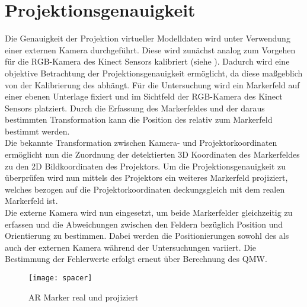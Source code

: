 \section{Projektionsgenauigkeit}
Die Genauigkeit der Projektion virtueller Modelldaten wird unter Verwendung einer externen Kamera durchgeführt. Diese wird zunächst analog zum Vorgehen für die RGB-Kamera des Kinect Sensors kalibriert (siehe ). Dadurch wird eine objektive Betrachtung der Projektionsgenauigkeit ermöglicht, da diese maßgeblich von der Kalibrierung des  abhängt. Für die Untersuchung wird ein Markerfeld auf einer ebenen Unterlage fixiert und im Sichtfeld der RGB-Kamera des Kinect Sensors platziert. Durch die Erfassung des Markerfeldes und der daraus bestimmten Transformation kann die Position des  relativ zum Markerfeld bestimmt werden.\\
Die bekannte Transformation zwischen Kamera- und Projektorkoordinaten ermöglicht nun die Zuordnung der detektierten 3D Koordinaten des Markerfeldes zu den 2D Bildkoordinaten des Projektors. Um die Projektionsgenauigkeit zu überprüfen wird nun mittels des Projektors ein weiteres Markerfeld projiziert, welches bezogen auf die Projektorkoordinaten deckungsgleich mit dem realen Markerfeld ist. \\
Die externe Kamera wird nun eingesetzt, um beide Markerfelder gleichzeitig zu erfassen und die Abweichungen zwischen den Feldern bezüglich Position und Orientierung zu bestimmen. Dabei werden die Positionierungen sowohl des  als auch der externen Kamera während der Untersuchungen variiert. Die Bestimmung der Fehlerwerte erfolgt erneut über Berechnung des QMW.

\begin{figure}[!ht]
	\begin{center}
		\texttt{[image: spacer]}
		\caption{AR Marker real und projiziert}
		\label{fig.arprojected}
	\end{center}
\end{figure}


